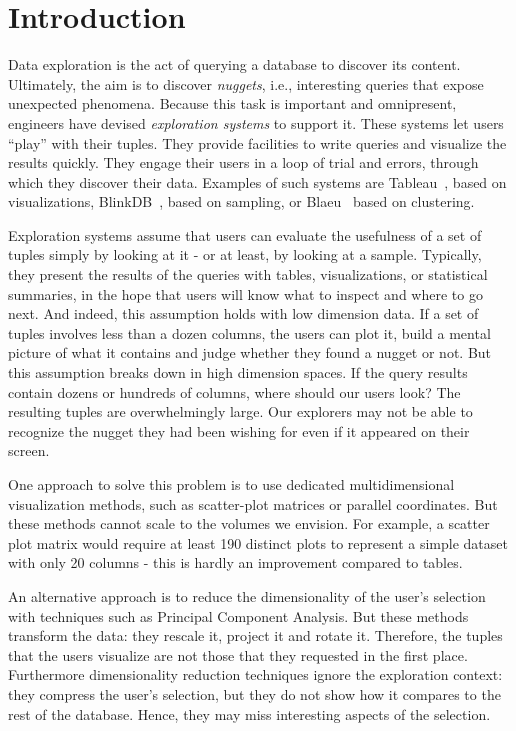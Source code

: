 \section{Introduction}
\label{sec:intro}

Data exploration is the act of querying a database to discover its content.
Ultimately, the aim is to discover \emph{nuggets}, i.e., interesting queries
that expose unexpected phenomena.  Because this task
is important and omnipresent, engineers have devised \emph{exploration
systems} to support it. These systems let users ``play'' with their tuples. They
provide facilities to write queries and visualize the results quickly.
They engage their users in a loop of trial and errors, through which they discover
their data. Examples of such systems are Tableau~\cite{StolteTangHanrahan2002},
based on visualizations, BlinkDB~\cite{agarwal2012blink}, based on sampling, or
Blaeu~\cite{sellamTKDE} based on clustering.

Exploration systems assume that users can evaluate the usefulness of a set of
tuples simply by looking at it - or at least, by looking at a sample.
Typically, they present the results of the queries with tables, visualizations,
or statistical summaries, in the hope that users will know what to inspect and
where to go next. And indeed, this assumption holds with low dimension data.
If a set of tuples involves less than a dozen columns, the users can plot it,
build a mental picture of what it contains and judge whether they 
found a nugget or not. But this assumption breaks down in high dimension spaces.
If the query results contain dozens or hundreds of columns, where should our
users look? The resulting tuples are overwhelmingly large.  Our
explorers may not be able to recognize the nugget they had been wishing for
even if it appeared on their screen.  

One approach to solve this problem is to use dedicated multidimensional
visualization methods, such as scatter-plot matrices or parallel coordinates.
But these methods cannot scale to the volumes we envision. For example, a
scatter plot matrix would require at least 190 distinct plots to represent a
simple dataset with only 20 columns - this is hardly an improvement compared to
tables.

An alternative approach is to reduce the dimensionality of the user's selection
with techniques such as Principal Component Analysis.  But these methods
transform the data: they rescale it, project it and rotate it.  Therefore, the
tuples that the users visualize are not those that they requested in the first
place.  Furthermore dimensionality reduction techniques ignore the exploration
context: they compress the user's selection, but they do not show how it
compares to the rest of the database. Hence, they may miss interesting aspects
of the selection.

